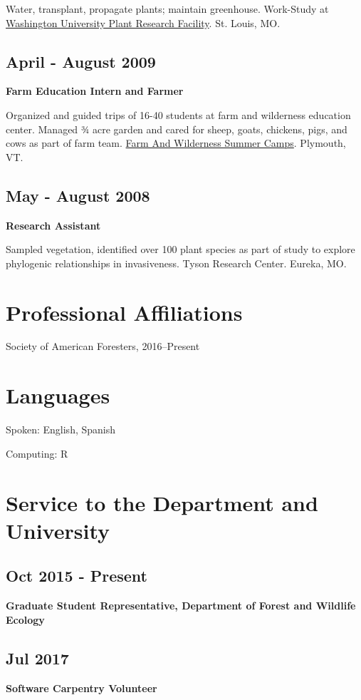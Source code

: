 \documentclass{article}
\begin{document}
Water, transplant, propagate plants; maintain greenhouse. Work-Study
at \href{http://biology4.wustl.edu/greenhouse/index.html}{Washington University Plant Research Facility}. St. Louis, MO.

\subsection*{April - August 2009}
\label{sec:orgdcd211b}
\textbf{Farm Education Intern and Farmer}

Organized and guided trips of 16-40 students at farm and wilderness
education center. Managed 3⁄4 acre garden and cared for sheep, goats,
chickens, pigs, and cows as part of farm team.  \href{https://farmandwilderness.org/}{Farm And Wilderness
Summer Camps}. Plymouth, VT.

\subsection*{May - August 2008}
\label{sec:orga0c6c6b}
\textbf{Research Assistant}

Sampled vegetation, identified over 100 plant species as part of study
to explore phylogenic relationships in invasiveness.  Tyson Research
Center. Eureka, MO.
\section*{Professional Affiliations}
\label{sec:org7f48b13}
Society of American Foresters, 2016--Present

\section*{Languages}
\label{sec:org8e844f9}
Spoken: English, Spanish

Computing: R

\section*{Service to the Department and University}
\label{sec:orgb309b79}
\subsection*{Oct 2015 - Present}
\label{sec:orga405f6f}
\textbf{Graduate Student Representative, Department of Forest and Wildlife
Ecology}
\subsection*{Jul 2017}
\label{sec:orgd0a63a3}
\textbf{Software Carpentry Volunteer}
\end{document}
